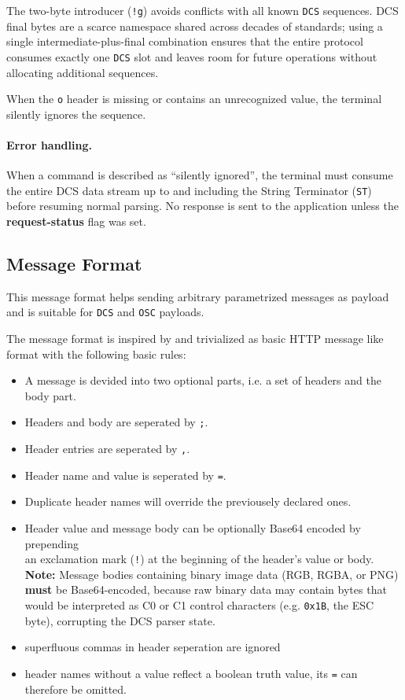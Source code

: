 \documentclass[a4paper]{article}
\newcommand{\code}[1]{\colorbox{light-gray}{\texttt{#1}}}
\begin{document}
The two-byte introducer (\code{!g}) avoids conflicts with all known
\code{DCS} sequences. DCS final bytes are a scarce namespace shared
across decades of standards; using a single intermediate-plus-final
combination ensures that the entire protocol consumes exactly one
\code{DCS} slot and leaves room for future operations without
allocating additional sequences.

When the \code{o} header is missing or contains an unrecognized value,
the terminal silently ignores the sequence.

\paragraph*{Error handling.}
When a command is described as ``silently ignored'', the terminal must consume
the entire DCS data stream up to and including the String Terminator (\code{ST})
before resuming normal parsing.
No response is sent to the application unless the \textbf{request-status} flag was set.

\subsection{Message Format} %

This message format helps sending arbitrary parametrized messages
as payload and is suitable for \code{DCS} and \code{OSC} payloads.

The message format is inspired by and trivialized as basic HTTP message like
format with the following basic rules:

\begin{itemize}
    \item A message is devided into two optional parts, i.e. a set of headers and the body part.
    \item Headers and body are seperated by \code{;}.
    \item Header entries are seperated by \code{,}.
    \item Header name and value is seperated by \code{=}.
    \item Duplicate header names will override the previousely declared ones.
    \item Header value and message body can be optionally Base64 encoded by prepending \\
        an exclamation mark (\code{!}) at the beginning of the header's value or body.
        \textbf{Note:} Message bodies containing binary image data (RGB, RGBA, or PNG)
        \textbf{must} be Base64-encoded, because raw binary data may contain bytes
        that would be interpreted as C0 or C1 control characters
        (e.g. \code{0x1B}, the ESC byte), corrupting the DCS parser state.
    \item superfluous commas in header seperation are ignored
    \item header names without a value reflect a boolean truth value,
        its \code{=} can therefore be omitted.
\end{itemize}
\end{document}
